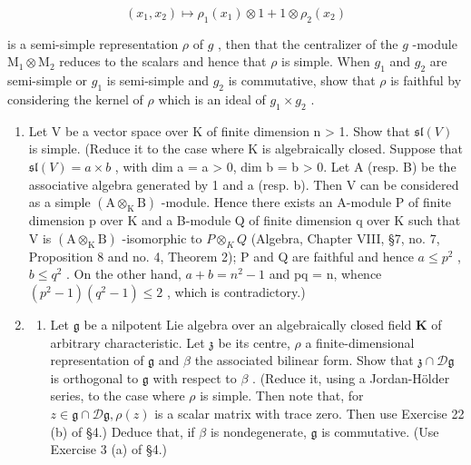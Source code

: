 \[
(x _ {1}, x _ {2}) \mapsto \rho_ {1} (x _ {1}) \otimes 1 + 1 \otimes \rho_ {2} (x _ {2})
\]

is a semi-simple representation \(\rho\) of \(g\) , then that the centralizer of the \(g\) -module \(\mathrm{M}_1 \otimes \mathrm{M}_2\) reduces to the scalars and hence that \(\rho\) is simple. When \(g_1\) and \(g_2\) are semi-simple or \(g_1\) is semi-simple and \(g_2\) is commutative, show that \(\rho\) is faithful by considering the kernel of \(\rho\) which is an ideal of \(g_1 \times g_2\) .

\begin{enumerate}
\def\labelenumi{\arabic{enumi}.}
\setcounter{enumi}{20}
\item
  Let V be a vector space over K of finite dimension n \textgreater{} 1. Show that \(\mathfrak{sl}(V)\) is simple. (Reduce it to the case where K is algebraically closed. Suppose that \(\mathfrak{sl}(V) = a \times b\) , with dim a = a \textgreater{} 0, dim b = b \textgreater{} 0. Let A (resp. B) be the associative algebra generated by 1 and a (resp. b). Then V can be considered as a simple \((\mathrm{A} \otimes_{\mathrm{K}} \mathrm{B})\) -module. Hence there exists an A-module P of finite dimension p over K and a B-module Q of finite dimension q over K such that V is \((\mathrm{A} \otimes_{\mathrm{K}} \mathrm{B})\) -isomorphic to \(P \otimes_{K} Q\) (Algebra, Chapter VIII, §7, no. 7, Proposition 8 and no. 4, Theorem 2); P and Q are faithful and hence \(a \leqslant p^{2}\) , \(b \leqslant q^{2}\) . On the other hand, \(a + b = n^{2} - 1\) and pq = n, whence \((p^{2} - 1)(q^{2} - 1) \leqslant 2\) , which is contradictory.)
\item
  \begin{enumerate}
  \def\labelenumii{(\alph{enumii})}
  \tightlist
  \item
    Let \(\mathfrak{g}\) be a nilpotent Lie algebra over an algebraically closed field \(\mathbf{K}\) of arbitrary characteristic. Let \(\mathfrak{z}\) be its centre, \(\rho\) a finite-dimensional representation of \(\mathfrak{g}\) and \(\beta\) the associated bilinear form. Show that \(\mathfrak{z}\cap \mathcal{D}\mathfrak{g}\) is orthogonal to \(\mathfrak{g}\) with respect to \(\beta\) . (Reduce it, using a Jordan-Hölder series, to the case where \(\rho\) is simple. Then note that, for \(z\in \mathfrak{g}\cap \mathcal{D}\mathfrak{g},\rho (z)\) is a scalar matrix with trace zero. Then use Exercise 22 (b) of §4.) Deduce that, if \(\beta\) is nondegenerate, \(\mathfrak{g}\) is commutative. (Use Exercise 3 (a) of §4.)
  \end{enumerate}
\end{enumerate}

